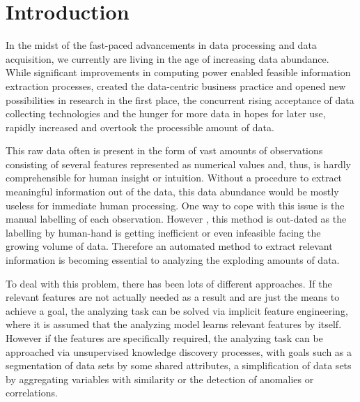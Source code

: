 \chapter{Introduction}\label{ch:intro}

In the midst of the fast-paced advancements in data processing and data acquisition, we currently are living in the age of increasing data abundance. While significant improvements in computing power enabled feasible information extraction processes, created the data-centric business practice and opened new possibilities in research in the first place, the concurrent rising acceptance of data collecting technologies and the hunger for more data in hopes for later use, rapidly increased and overtook the processible amount of data. 

This raw data often is present in the form of vast amounts of observations consisting of several features represented as numerical values and, thus, is hardly comprehensible for human insight or intuition. Without a 
procedure to extract meaningful information out of the data, this data abundance would be mostly useless for immediate human processing. One way to cope with this issue is the manual labelling of each observation. However , this method is out-dated as the labelling by human-hand is getting inefficient or even infeasible facing the growing volume of data. Therefore an automated method to extract relevant information is becoming essential to analyzing the exploding amounts of data. %

To deal with this problem, there has been lots of different approaches.
If the relevant features are not actually needed as a result and are just the means to achieve a goal, the analyzing task can be solved via implicit feature engineering, where it is assumed that the analyzing model learns relevant features by itself.
However if the features are specifically required, the analyzing task can be approached via unsupervised knowledge discovery processes, with goals such as a segmentation of data sets by some shared attributes, a simplification of data sets by aggregating variables with similarity or the detection of anomalies or correlations.


